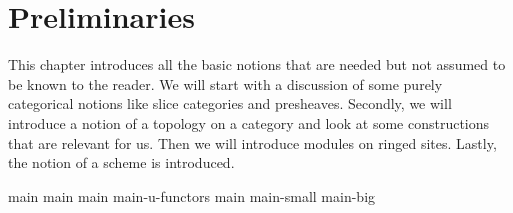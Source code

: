 \chapter{Preliminaries}
This chapter introduces all the basic notions that are needed but not assumed to be known to the reader.
We will start with a discussion of some purely categorical notions like slice categories and presheaves.
Secondly, we will introduce a notion of a topology on a category and look at some constructions that are relevant for us.
Then we will introduce modules on ringed sites.
Lastly, the notion of a scheme is introduced.

{main}
{main}
{main}
{main-u-functors}
{main}
{main-small}
{main-big}